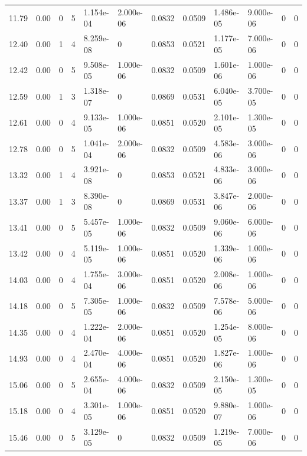 \documentclass[preview]{standalone}
\begin{document}
{{{\begin{tabular}{L{1.2cm}C{1.2cm} C{0.3cm}C{0.5cm} C{1.4cm}C{1.4cm} C{1.4cm}C{1.4cm} C{1.6cm}C{1.6cm} C{1.6cm}C{1.6cm}}
  11.79  &  0.00  & 0     &  5 &  1.154e-04  & 2.000e-06  &  0.0832&   0.0509& 1.486e-05 & 9.000e-06   &  0 & 0  \\ 
  12.40  &  0.00  & 1     &  4 &  8.259e-08  & 0  &  0.0853&   0.0521& 1.177e-05 & 7.000e-06   &  0 & 0  \\ 
  12.42  &  0.00  & 0     &  5 &  9.508e-05  & 1.000e-06  &  0.0832&   0.0509& 1.601e-06 & 1.000e-06   &  0 & 0  \\ 
  12.59  &  0.00  & 1     &  3 &  1.318e-07  & 0  &  0.0869&   0.0531& 6.040e-05 & 3.700e-05   &  0 & 0  \\ 
  12.61  &  0.00  & 0     &  4 &  9.133e-05  & 1.000e-06  &  0.0851&   0.0520& 2.101e-05 & 1.300e-05   &  0 & 0  \\ 
  12.78  &  0.00  & 0     &  5 &  1.041e-04  & 2.000e-06  &  0.0832&   0.0509& 4.583e-06 & 3.000e-06   &  0 & 0  \\ 
  13.32  &  0.00  & 1     &  4 &  3.921e-08  & 0  &  0.0853&   0.0521& 4.833e-06 & 3.000e-06   &  0 & 0  \\ 
  13.37  &  0.00  & 1     &  3 &  8.390e-08  & 0  &  0.0869&   0.0531& 3.847e-06 & 2.000e-06   &  0 & 0  \\ 
  13.41  &  0.00  & 0     &  5 &  5.457e-05  & 1.000e-06  &  0.0832&   0.0509& 9.060e-06 & 6.000e-06   &  0 & 0  \\ 
  13.42  &  0.00  & 0     &  4 &  5.119e-05  & 1.000e-06  &  0.0851&   0.0520& 1.339e-06 & 1.000e-06   &  0 & 0  \\ 
  14.03  &  0.00  & 0     &  4 &  1.755e-04  & 3.000e-06  &  0.0851&   0.0520& 2.008e-06 & 1.000e-06   &  0 & 0  \\ 
  14.18  &  0.00  & 0     &  5 &  7.305e-05  & 1.000e-06  &  0.0832&   0.0509& 7.578e-06 & 5.000e-06   &  0 & 0  \\ 
  14.35  &  0.00  & 0     &  4 &  1.222e-04  & 2.000e-06  &  0.0851&   0.0520& 1.254e-05 & 8.000e-06   &  0 & 0  \\ 
  14.93  &  0.00  & 0     &  4 &  2.470e-04  & 4.000e-06  &  0.0851&   0.0520& 1.827e-06 & 1.000e-06   &  0 & 0  \\ 
  15.06  &  0.00  & 0     &  5 &  2.655e-04  & 4.000e-06  &  0.0832&   0.0509& 2.150e-05 & 1.300e-05   &  0 & 0  \\ 
  15.18  &  0.00  & 0     &  4 &  3.301e-05  & 1.000e-06  &  0.0851&   0.0520& 9.880e-07 & 1.000e-06   &  0 & 0  \\ 
  15.46  &  0.00  & 0     &  5 &  3.129e-05  & 0  &  0.0832&   0.0509& 1.219e-05 & 7.000e-06   &  0 & 0  \\ 

\end{tabular}}}}
\end{document}

